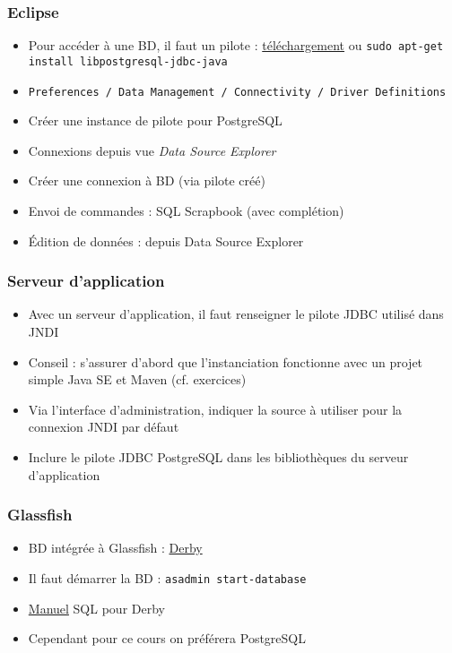 \documentclass[english, french]{beamer}
\begin{document}
\begin{frame}
	\frametitle{Eclipse}
	\begin{itemize}
		\item Pour accéder à une BD, il faut un pilote : \href{https://jdbc.postgresql.org/}{téléchargement} {\tiny ou \texttt{sudo apt-get install libpostgresql-jdbc-java}}
		\item \texttt{Preferences / Data Management / Connectivity / Driver Definitions}
		\item Créer une instance de pilote pour PostgreSQL
		\item Connexions depuis vue \emph{Data Source Explorer}
		\item Créer une connexion à BD (via pilote créé)
		\item Envoi de commandes : SQL Scrapbook (avec complétion)
		\item Édition de données : depuis Data Source Explorer
	\end{itemize}
\end{frame}

\begin{frame}
	\frametitle{Serveur d’application}
	\begin{itemize}
		\item Avec un serveur d’application, il faut renseigner le pilote JDBC utilisé dans JNDI
		\item Conseil : s’assurer d’abord que l’instanciation fonctionne avec un projet simple Java SE et Maven (cf. exercices)
		\item Via l’interface d’administration, indiquer la source à utiliser pour la connexion JNDI par défaut
		\item Inclure le pilote JDBC PostgreSQL dans les bibliothèques du serveur d’application
	\end{itemize}
\end{frame}

\begin{frame}
	\frametitle{Glassfish}
	\begin{itemize}
		\item BD intégrée à Glassfish : \href{https://db.apache.org/derby/}{Derby}
		\item Il faut démarrer la BD : \texttt{asadmin start-database}
		\item \href{https://db.apache.org/derby/docs/10.10/ref/index.html}{Manuel} SQL pour Derby
		\item Cependant pour ce cours on préférera PostgreSQL
	\end{itemize}
\end{frame}
\end{document}
